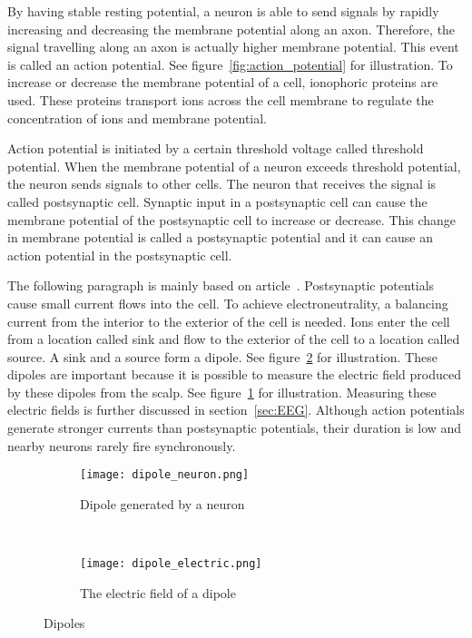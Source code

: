 By having stable resting potential, a neuron is able to send signals by rapidly increasing and decreasing the membrane potential along an axon. Therefore, the signal travelling along an axon is actually higher membrane potential. This event is called an action potential. See figure~\ref{fig:action_potential} for illustration. To increase or decrease the membrane potential of a cell, ionophoric proteins are used. These proteins transport ions across the cell membrane to regulate the concentration of ions and membrane potential.

Action potential is initiated by a certain threshold voltage called threshold potential. When the membrane potential of a neuron exceeds threshold potential, the neuron sends signals to other cells. The neuron that receives the signal is called postsynaptic cell. Synaptic input in a postsynaptic cell can cause the membrane potential of the postsynaptic cell to increase or decrease. This change in membrane potential is called a postsynaptic potential and it can cause an action potential in the postsynaptic cell.

The following paragraph is mainly based on article~\cite{electric_field}. Postsynaptic potentials cause small current flows into the cell. To achieve electroneutrality, a balancing current from the interior to the exterior of the cell is needed. Ions enter the cell from a location called sink and flow to the exterior of the cell to a location called source. A sink and a source form a dipole. See figure~\ref{fig:dipole_electric} for illustration. These dipoles are important because it is possible to measure the electric field produced by these dipoles from the scalp. See figure~\ref{fig:dipole_neuron} for illustration. Measuring these electric fields is further discussed in section~\ref{sec:EEG}. Although action potentials generate stronger currents than postsynaptic potentials, their duration is low and nearby neurons rarely fire synchronously.

\begin{figure}[h!]
	\centering
	\begin{subfigure}{0.48\textwidth}
		\texttt{[image: dipole\_neuron.png]}
		\caption{Dipole generated by a neuron~\cite[p.~669]{neuroscience}}
		\label{fig:dipole_neuron}
	\end{subfigure}
	~
	\begin{subfigure}{0.48\textwidth}
		\texttt{[image: dipole\_electric.png]}
		\caption{The electric field of a dipole\protect\footnotemark}
		\label{fig:dipole_electric}
	\end{subfigure}
	\caption{Dipoles}
	\label{fig:dipole}
\end{figure}

